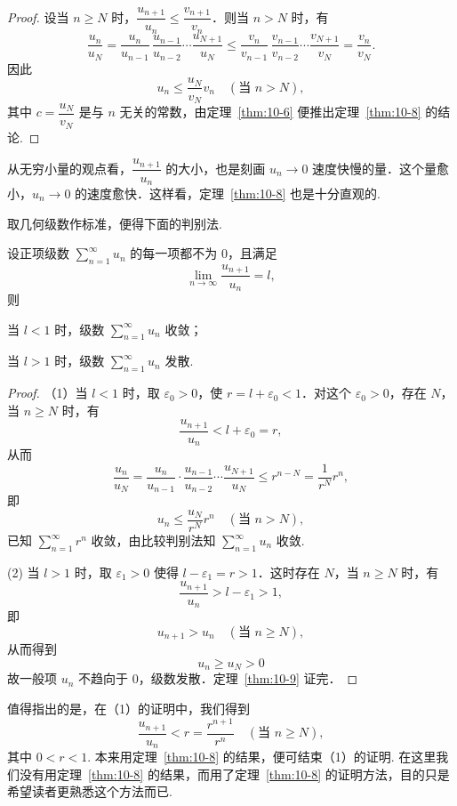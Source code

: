 \begin{proof}
设当 $n\geqslant N$ 时，$\dfrac{u_{n+1}}{u_{n}}\leqslant\dfrac{v_{n+1}}{v_{n}}$．则当 $n>N$ 时，有
\[
\frac{u_{n}}{u_{N}}=\frac{u_{n}}{u_{n-1}}\,\frac{u_{n-1}}{u_{n-2}}\cdots\frac{u_{N+1}}{u_{N}}\leqslant\frac{v_{n}}{v_{n-1}}\,\frac{v_{n-1}}{v_{n-2}}\cdots\frac{v_{N+1}}{v_{N}}=\frac{v_{n}}{v_{N}}.
\]
因此
\[
u_{n}\leqslant\frac{u_{N}}{v_{N}}v_{n}\quad(\text{当 }n>N),
\]
其中 $c=\dfrac{u_{N}}{v_{N}}$ 是与 $n$ 无关的常数，由定理~\ref{thm:10-6} 便推出定理~\ref{thm:10-8} 的结论.
\end{proof}

从无穷小量的观点看，$\dfrac{u_{n+1}}{u_{n}}$ 的大小，也是刻画 $u_{n}\to0$ 速度快慢的量．这个量愈小，$u_{n}\to0$ 的速度愈快．这样看，定理~\ref{thm:10-8} 也是十分直观的.

取几何级数作标准，便得下面的判别法.

\begin{theorem}[达朗贝尔判别法]\label{thm:10-9}
设正项级数 $\sum_{n=1}^{\infty}u_{n}$ 的每一项都不为 $0$，且满足
\[
\lim_{n\to\infty}\frac{u_{n+1}}{u_{n}}=l,
\]
则
\begin{ziti}
\item 当 $l<1$ 时，级数 $\sum_{n=1}^{\infty}u_{n}$ 收敛；
\item 当 $l>1$ 时，级数 $\sum_{n=1}^{\infty}u_{n}$ 发散.
\end{ziti}
\end{theorem}

\begin{proof}
（1）当 $l<1$ 时，取 $\varepsilon_{0}>0$，使 $r=l+\varepsilon_{0}<1$．对这个 $\varepsilon_{0}>0$，存在 $N$，当 $n\geqslant N$ 时，有
\[
\frac{u_{n+1}}{u_{n}}<l+\varepsilon_{0}=r,
\]
从而
\[
\frac{u_{n}}{u_{N}}=\frac{u_{n}}{u_{n-1}}\cdot\frac{u_{n-1}}{u_{n-2}}\cdots\frac{u_{N+1}}{u_{N}}\leqslant r^{n-N}=\frac{1}{r^{N}}r^{n},
\]
即
\[
u_{n}\leqslant\frac{u_{N}}{r^{N}}r^{n}\quad(\text{当 }n>N),
\]
已知 $\sum_{n=1}^{\infty}r^{n}$ 收敛，由比较判别法知 $\sum_{n=1}^{\infty}u_{n}$ 收敛.

(2) 当 $l>1$ 时，取 $\varepsilon_{1}>0$ 使得 $l-\varepsilon_{1}=r>1$．这时存在 $N$，当 $n\geqslant N$ 时，有
\[
\frac{u_{n+1}}{u_{n}}>l-\varepsilon_{1}>1,
\]
即
\[
u_{n+1}>u_{n}\quad(\text{当 }n\geqslant N),
\]
从而得到
\[
u_{n}\geqslant u_{N}>0
\]
故一般项 $u_{n}$ 不趋向于 $0$，级数发散．定理~\ref{thm:10-9} 证完．
\end{proof}

值得指出的是，在（1）的证明中，我们得到
\[
\frac{u_{n+1}}{u_{n}}<r=\frac{r^{n+1}}{r^{n}}\quad(\text{当 }n\geqslant N),
\]
其中 $0<r<1$. 本来用定理~\ref{thm:10-8} 的结果，便可结束（1）的证明. 在这里我们没有用定理~\ref{thm:10-8} 的结果，而用了定理~\ref{thm:10-8} 的证明方法，目的只是希望读者更熟悉这个方法而已.


